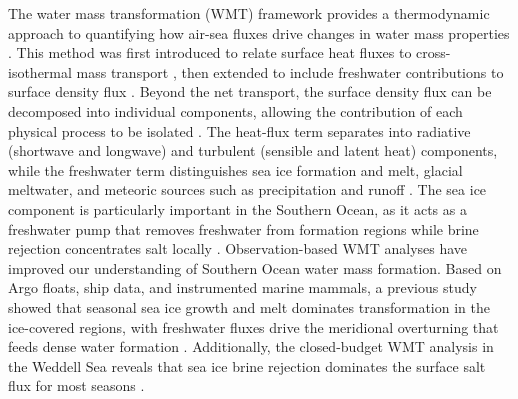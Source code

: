 \documentclass[pdflatex,sn-nature]{sn-jnl}
\begin{document}
The water mass transformation (WMT) framework provides a thermodynamic approach to quantifying how air-sea fluxes drive changes in water mass properties \cite{Walin1982,Groeskamp2019,drake2025water}. This method was first introduced to relate surface heat fluxes to cross-isothermal mass transport \cite{Walin1982}, then extended  to include freshwater contributions to surface density flux \cite{Speer1992}. Beyond the net transport, the surface density flux can be decomposed into individual components, allowing the contribution of each physical process to be isolated \cite{Iudicone2008a,Iudicone2008b}. The heat-flux term separates into radiative (shortwave and longwave) and turbulent (sensible and latent heat) components, while the freshwater term distinguishes sea ice formation and melt, glacial meltwater, and meteoric sources such as precipitation and runoff \cite{Abernathey2016,Bailey2023}. The sea ice component is particularly important in the Southern Ocean, as it acts as a freshwater pump that removes freshwater from formation regions while brine rejection concentrates salt locally \cite{Abernathey2016}.
Observation-based WMT analyses have improved our understanding of Southern Ocean water mass formation.  Based on Argo floats, ship data, and instrumented marine mammals, a previous study showed that seasonal sea ice growth and melt dominates transformation in the ice-covered regions, with freshwater fluxes drive the meridional overturning that feeds dense water formation \cite{Pellichero2018}. Additionally, the closed-budget WMT analysis in the Weddell Sea reveals that sea ice brine rejection dominates the surface salt flux for most seasons \cite{Bailey2023}.
\end{document}
